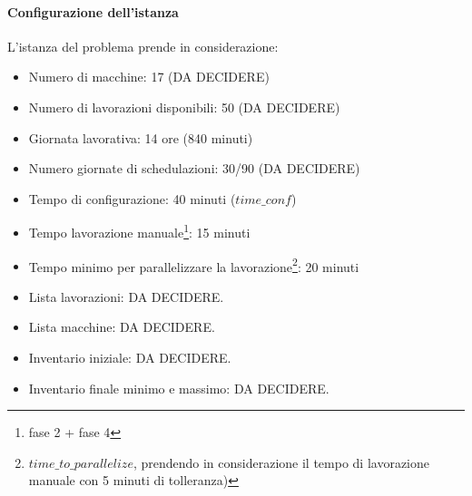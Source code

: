 \paragraph*{Configurazione dell'istanza} 
L'istanza del problema prende in considerazione:
\begin{itemize}
    \item Numero di macchine: 17 (DA DECIDERE)
    \item Numero di lavorazioni disponibili: 50 (DA DECIDERE)
    \item Giornata lavorativa: 14 ore (840 minuti)
    \item Numero giornate di schedulazioni: 30/90 (DA DECIDERE)
    \item Tempo di configurazione: 40 minuti (\(time\_conf\))
    \item Tempo lavorazione manuale\footnote{fase 2 + fase 4}: 15 minuti
    \item Tempo minimo per parallelizzare la lavorazione\footnote{\(time\_to\_parallelize\), prendendo in considerazione il tempo di lavorazione manuale con 5 minuti di tolleranza)}: 20 minuti
    \item Lista lavorazioni: DA DECIDERE.
    \item Lista macchine: DA DECIDERE.
    \item Inventario iniziale: DA DECIDERE.
    \item Inventario finale minimo e massimo: DA DECIDERE.
\end{itemize}

